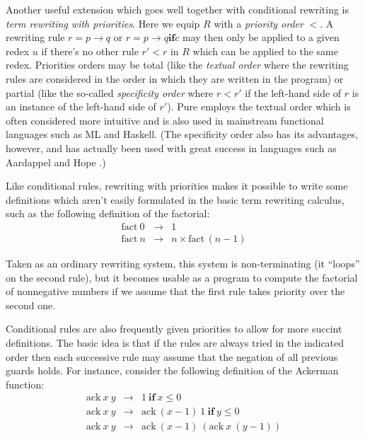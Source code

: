 \documentclass[a4paper,12pt]{article}
\begin{document}
Another useful extension which goes well together with conditional rewriting is \emph{term rewriting with priorities}. Here we equip $R$ with a \emph{priority order} $<$. A rewriting rule $r=p\rightarrow q$ or $r=p\rightarrow q\mathrel{\mathbf{if}} c$ may then only be applied to a given redex $u$ if there's no other rule $r'<r$ in $R$ which can be applied to the same redex. Priorities orders may be total (like the \emph{textual order} where the rewriting rules are considered in the order in which they are written in the program) or partial (like the so-called \emph{specificity order} where $r<r'$ if the left-hand side of $r$ is an instance of the left-hand side of $r'$). Pure employs the textual order which is often considered more intuitive and is also used in mainstream functional languages such as ML and Haskell. (The specificity order also has its advantages, however, and has actually been used with great success in languages such as Aardappel \cite{Aardappel} and Hope \cite{Hope}.)

Like conditional rules, rewriting with priorities makes it possible to write some definitions which aren't easily formulated in the basic term rewriting calculus, such as the following definition of the factorial:
\begin{eqnarray*}
  \mathrm{fact}\ 0&\rightarrow&1\\
  \mathrm{fact}\ n&\rightarrow&n\times\mathrm{fact}\,(n-1)
\end{eqnarray*}

Taken as an ordinary rewriting system, this system is non-terminating (it ``loops'' on the second rule), but it becomes usable as a program to compute the factorial of nonnegative numbers if we assume that the first rule takes priority over the second one.

Conditional rules are also frequently given priorities to allow for more succint definitions. The basic idea is that if the rules are always tried in the indicated order then each successive rule may assume that the negation of all previous guards holds. For instance, consider the following definition of the Ackerman function:
\begin{eqnarray*}
  \mathrm{ack}\ x\ y&\rightarrow&1\ \mathbf{if}\ x\leq 0\\
  \mathrm{ack}\ x\ y&\rightarrow&\mathrm{ack}\ (x-1)\ 1\ \mathbf{if}\ y\leq 0\\
  \mathrm{ack}\ x\ y&\rightarrow&\mathrm{ack}\ (x-1)\ (\mathrm{ack}\ x\ (y-1))
\end{eqnarray*}
\end{document}

